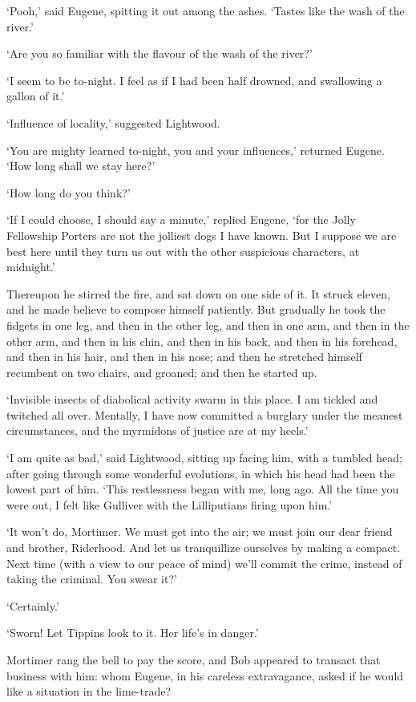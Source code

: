 ‘Pooh,’ said Eugene, spitting it out among the ashes. ‘Tastes like the
wash of the river.’

‘Are you so familiar with the flavour of the wash of the river?’

‘I seem to be to-night. I feel as if I had been half drowned, and
swallowing a gallon of it.’

‘Influence of locality,’ suggested Lightwood.

‘You are mighty learned to-night, you and your influences,’ returned
Eugene. ‘How long shall we stay here?’

‘How long do you think?’

‘If I could choose, I should say a minute,’ replied Eugene, ‘for the
Jolly Fellowship Porters are not the jolliest dogs I have known. But
I suppose we are best here until they turn us out with the other
suspicious characters, at midnight.’

Thereupon he stirred the fire, and sat down on one side of it. It struck
eleven, and he made believe to compose himself patiently. But gradually
he took the fidgets in one leg, and then in the other leg, and then in
one arm, and then in the other arm, and then in his chin, and then in
his back, and then in his forehead, and then in his hair, and then in
his nose; and then he stretched himself recumbent on two chairs, and
groaned; and then he started up.

‘Invisible insects of diabolical activity swarm in this place. I am
tickled and twitched all over. Mentally, I have now committed a burglary
under the meanest circumstances, and the myrmidons of justice are at my
heels.’

‘I am quite as bad,’ said Lightwood, sitting up facing him, with a
tumbled head; after going through some wonderful evolutions, in which
his head had been the lowest part of him. ‘This restlessness began with
me, long ago. All the time you were out, I felt like Gulliver with the
Lilliputians firing upon him.’

‘It won’t do, Mortimer. We must get into the air; we must join our dear
friend and brother, Riderhood. And let us tranquillize ourselves by
making a compact. Next time (with a view to our peace of mind) we’ll
commit the crime, instead of taking the criminal. You swear it?’

‘Certainly.’

‘Sworn! Let Tippins look to it. Her life’s in danger.’

Mortimer rang the bell to pay the score, and Bob appeared to transact
that business with him: whom Eugene, in his careless extravagance, asked
if he would like a situation in the lime-trade?

